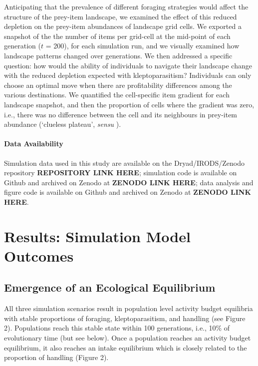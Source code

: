 \documentclass[11pt]{article}
\begin{document}
Anticipating that the prevalence of different foraging strategies would affect the structure of the prey-item landscape, we examined the effect of this reduced depletion on the prey-item abundances of landscape grid cells.
We exported a snapshot of the the number of items per grid-cell at the mid-point of each generation ($t$ = 200), for each simulation run, and we visually examined how landscape patterns changed over generations.
We then addressed a specific question: how would the ability of individuals to navigate their landscape change with the reduced depletion expected with kleptoparasitism?
Individuals can only choose an optimal move when there are profitability differences among the various destinations.
We quantified the cell-specific item gradient for each landscape snapshot, and then the proportion of cells where the gradient was zero, i.e., there was no difference between the cell and its neighbours in prey-item abundance (`clueless plateau', \textit{sensu} \citealt{perkins1992a}).

\paragraph*{Data Availability}

Simulation data used in this study are available on the Dryad/IRODS/Zenodo repository \textbf{REPOSITORY LINK HERE}; 
simulation code is available on Github and archived on Zenodo at \textbf{ZENODO LINK HERE}; 
data analysis and figure code is available on Github and archived on Zenodo at \textbf{ZENODO LINK HERE}.

\section{Results: Simulation Model Outcomes}

\subsection{Emergence of an Ecological Equilibrium}

All three simulation scenarios result in population level activity budget equilibria with stable proportions of foraging, kleptoparasitism, and handling (see Figure 2).
Populations reach this stable state within 100 generations, i.e., 10\% of evolutionary time (but see below).
Once a population reaches an activity budget equilibrium, it also reaches an intake equilibrium which is closely related to the proportion of handling (Figure 2).
\end{document}
